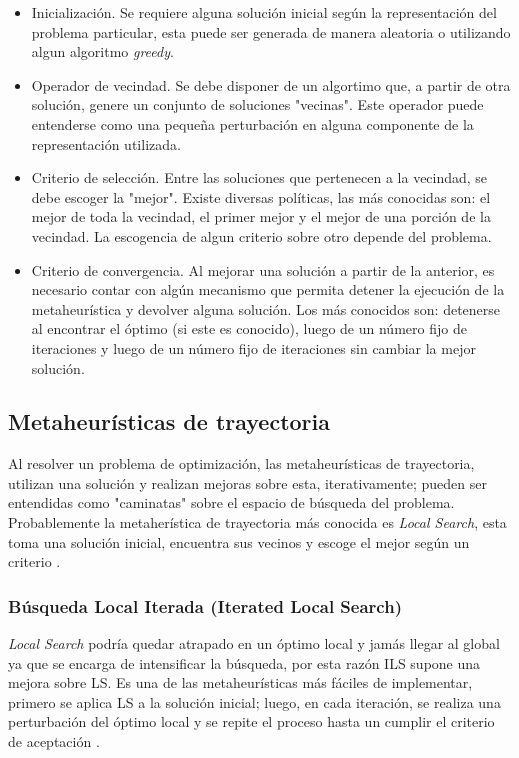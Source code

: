 \documentclass{ci5652}
\begin{document}
\begin{itemize}
  \item Inicialización. Se requiere alguna solución inicial según la 
  representación del problema particular, esta puede ser generada de manera
  aleatoria o utilizando algun algoritmo \textit{greedy}.
  \item Operador de vecindad. Se debe disponer de un algortimo que, a partir de
  otra solución, genere un conjunto de soluciones "vecinas". Este operador puede
  entenderse como una pequeña perturbación en alguna componente de la 
  representación utilizada.
  \item Criterio de selección. Entre las soluciones que pertenecen a la 
  vecindad, se debe escoger la "mejor". Existe diversas políticas, las más
  conocidas son: el mejor de toda la vecindad, el primer mejor y el mejor de una
  porción de la vecindad. La escogencia de algun criterio sobre otro depende del
  problema.
  \item Criterio de convergencia. Al mejorar una solución a partir de la 
  anterior, es necesario contar con algún mecanismo que permita detener la
  ejecución de la metaheurística y devolver alguna solución. Los más conocidos
  son: detenerse al encontrar el óptimo (si este es conocido), luego de un 
  número fijo de iteraciones y luego de un número fijo de iteraciones sin 
  cambiar la mejor solución.
\end{itemize}

\subsection{Metaheurísticas de trayectoria}

Al resolver un problema de optimización, las metaheurísticas de trayectoria,
utilizan una solución y realizan mejoras sobre esta, iterativamente; pueden ser
entendidas como "caminatas" sobre el espacio de búsqueda del problema. 
Probablemente la metaherística de trayectoria más conocida es 
\textit{Local Search}, esta toma una solución inicial, encuentra sus vecinos y
escoge el mejor según un criterio \cite{Talbi_2009}. 

\subsubsection{Búsqueda Local Iterada (Iterated Local Search)}

\textit{Local Search} podría quedar atrapado en un óptimo local y jamás llegar al global ya que se encarga de intensificar la búsqueda, por esta razón ILS supone una mejora sobre LS. Es una de las metaheurísticas más fáciles de implementar, primero se aplica LS a la solución inicial; luego, en cada iteración, se realiza una perturbación del óptimo local y se repite el proceso hasta un cumplir el criterio de aceptación \cite{Talbi_2009}.
\end{document}
